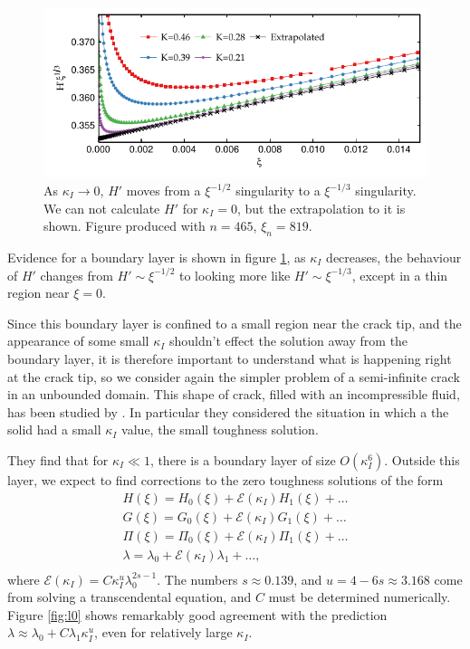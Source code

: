 \documentclass{jfm}
\newcommand{\cE}{\mathcal{E}}
\begin{document}
\begin{figure}
  \centerline{\includegraphics{./../../Graphs/hprime-x.pdf}}
  \caption{As $\kappa_I\to 0$, $H'$ moves from a $\xi^{-1/2}$ singularity to a 
           $\xi^{-1/3}$ singularity. We can not calculate $H'$ for $\kappa_I=0$, 
           but the extrapolation to it is shown. Figure produced with $n=465$,
           $\xi_n = 819$.}\label{fig:hprime-x}
\end{figure}
Evidence for a boundary layer is shown in figure \ref{fig:hprime-x}, as
$\kappa_I$ decreases, the behaviour of $H'$ changes from $H' \sim \xi^{-1/2}$
to looking more like $H' \sim \xi^{-1/3}$, except in a thin region near 
$\xi =0$.

Since this boundary layer is confined to a small region near the crack tip, and
the appearance of some small $\kappa_I$ shouldn't effect the solution away from
the boundary layer, it is therefore important to understand what is happening 
right at the crack tip, so we consider again the simpler problem of a 
semi-infinite crack in an unbounded domain. This shape of crack, filled with 
an incompressible fluid, has been studied by \citet{Garagash}. In particular 
they considered the situation in which a the solid had a small $\kappa_I$ 
value, the small toughness solution. 

They find that for $\kappa_I \ll 1$, there is a boundary layer of size 
$O(\kappa_I^6)$. Outside this layer, we expect to find corrections to the 
zero toughness solutions of the form
\begin{equation}
\begin{array}{c}
H(\xi) = H_0(\xi) + \cE(\kappa_I) H_1(\xi) + \dots \\
G(\xi) = G_0(\xi) + \cE(\kappa_I) G_1(\xi) + \dots \\
\Pi(\xi) = \Pi_0(\xi) + \cE(\kappa_I) \Pi_1(\xi) + \dots \\
\lambda = \lambda_0 + \cE(\kappa_I) \lambda_1 + \dots, \\
\end{array}
\end{equation}
where $\mathcal{E}(\kappa_I) = C \kappa_I^u\lambda_0^{2s-1}$. The numbers 
$s \approx 0.139$, and $u = 4 -6s \approx 3.168$ come from solving a 
transcendental equation, and $C$ must be determined numerically. Figure 
\ref{fig:l0} shows remarkably good agreement with the prediction $\lambda 
\approx \lambda_0 + C\lambda_1 \kappa_I^u$, even for relatively large 
$\kappa_I$.
\end{document}
